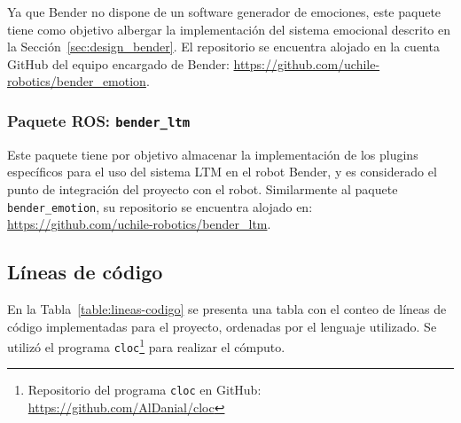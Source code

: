 Ya que Bender no dispone de un software generador de emociones, este paquete tiene como objetivo albergar la implementación del sistema emocional descrito en la Sección~\ref{sec:design_bender}. El repositorio se encuentra alojado en la cuenta GitHub del equipo encargado de Bender: \url{https://github.com/uchile-robotics/bender\_emotion}.


\subsubsection{Paquete ROS: \texttt{bender\_ltm}}

Este paquete tiene por objetivo almacenar la implementación de los plugins específicos para el uso del sistema LTM en el robot Bender, y es considerado el punto de integración del proyecto con el robot. Similarmente al paquete \texttt{bender\_emotion}, su repositorio se encuentra alojado en: \url{https://github.com/uchile-robotics/bender\_ltm}.


\subsection{Líneas de código}

En la Tabla~\ref{table:lineas-codigo} se presenta una tabla con el conteo de líneas de código implementadas para el proyecto, ordenadas por el lenguaje utilizado. Se utilizó el programa \texttt{cloc}\footnote{Repositorio del programa \texttt{cloc} en GitHub: \url{https://github.com/AlDanial/cloc}} para realizar el cómputo.

